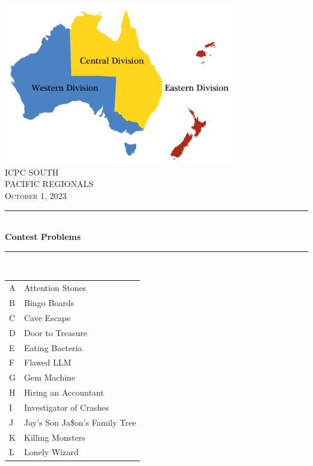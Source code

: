 \documentclass[noproblemids,a4paper]{problemset}
\newcommand{\HRule}{\rule{\linewidth}{0.5mm}}
\begin{document}
\normalsize


\thispagestyle{empty}
\begin{center}
\vspace*{\fill}
\includegraphics[width=10cm]{spp_divisions.png} \\

\textsc{\Huge ICPC SOUTH \\[0.3cm] PACIFIC REGIONALS}\\[0.5cm]

\textsc{\Large October 1, 2023}\\[0.3cm]

\HRule \\[0.3cm]

{ \huge \bfseries Contest Problems \\[0.3cm] }

\HRule \\[0.5cm]

{\large
\begin{tabular}{l@{:\hskip4pt}l}
A&Attention Stones\\
B&Bingo Boards\\
C&Cave Escape\\
D&Door to Treasure\\
E&Eating Bacteria\\
F&Flawed LLM\\
G&Gem Machine\\
H&Hiring an Accountant\\
I&Investigator of Crashes\\
J&Jay's Son Ja\$on's Family Tree\\
K&Killing Monsters\\
L&Lonely Wizard\\
\end{tabular}
}
\vspace*{\fill}
\end{center}
\end{document}
